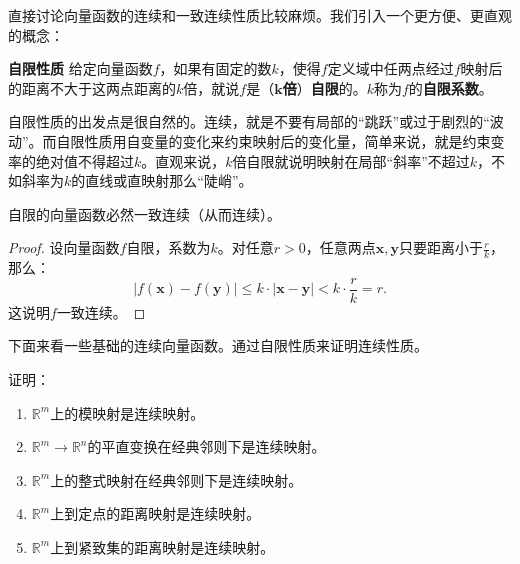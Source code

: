 \documentclass[12pt,UTF8]{ctexbook}
\begin{document}
直接讨论向量函数的连续和一致连续性质比较麻烦。我们引入一个更方便、更直观的概念：
\begin{df}{\textbf{自限性质}}
    给定向量函数$f$，如果有固定的数$k$，使得$f$定义域中任两点经过$f$映射后的距离不大于这两点距离的$k$倍，就说$f$是（$\boldsymbol{k}$\textbf{倍}）\textbf{自限}的。$k$称为$f$的\textbf{自限系数}。
\end{df}

自限性质的出发点是很自然的。连续，就是不要有局部的“跳跃”或过于剧烈的“波动”。而自限性质用自变量的变化来约束映射后的变化量，简单来说，就是约束变率的绝对值不得超过$k$。直观来说，$k$倍自限就说明映射在局部“斜率”不超过$k$，不如斜率为$k$的直线或直映射那么“陡峭”。

\begin{tm}
    自限的向量函数必然一致连续（从而连续）。
\end{tm}

\begin{proof}
    设向量函数$f$自限，系数为$k$。对任意$r>0$，任意两点$\mathbf{x},\mathbf{y}$只要距离小于$\displaystyle\frac{r}{k}$，那么：
    $$ |f(\mathbf{x}) - f(\mathbf{y})| \leqslant k\cdot |\mathbf{x} - \mathbf{y}| < k \cdot \frac{r}{k} = r. $$
    这说明$f$一致连续。
\end{proof}

下面来看一些基础的连续向量函数。通过自限性质来证明连续性质。

\begin{et}
    证明：
    \begin{enumerate}
        \item $\mathbb{R}^m$上的模映射是连续映射。
        \item $\mathbb{R}^m \rightarrow \mathbb{R}^n$的平直变换在经典邻则下是连续映射。
        \item $\mathbb{R}^m$上的整式映射在经典邻则下是连续映射。
        \item $\mathbb{R}^m$上到定点的距离映射是连续映射。
        \item $\mathbb{R}^m$上到紧致集的距离映射是连续映射。
    \end{enumerate}
\end{et}
\end{document}
